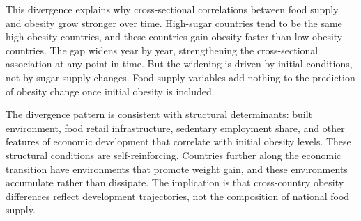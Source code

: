 This divergence explains why cross-sectional correlations between food supply and obesity grow stronger over time. High-sugar countries tend to be the same high-obesity countries, and these countries gain obesity faster than low-obesity countries. The gap widens year by year, strengthening the cross-sectional association at any point in time. But the widening is driven by initial conditions, not by sugar supply changes. Food supply variables add nothing to the prediction of obesity change once initial obesity is included.

The divergence pattern is consistent with structural determinants: built environment, food retail infrastructure, sedentary employment share, and other features of economic development that correlate with initial obesity levels. These structural conditions are self-reinforcing. Countries further along the economic transition have environments that promote weight gain, and these environments accumulate rather than dissipate. The implication is that cross-country obesity differences reflect development trajectories, not the composition of national food supply.
